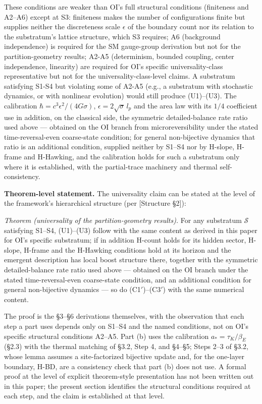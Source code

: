 \documentclass[
]{article}
\begin{document}
These conditions are weaker than OI's full structural conditions
(finiteness and A2--A6) except at S3: finiteness makes the number of
configurations finite but supplies neither the discreteness scale
\(\epsilon\) of the boundary count nor its relation to the substratum's
lattice structure, which S3 requires; A6 (background independence) is
required for the SM gauge-group derivation but not for the
partition-geometry results; A2-A5 (determinism, bounded coupling, center
independence, linearity) are required for OI's specific
universality-class representative but not for the
universality-class-level claims. A substratum satisfying S1-S4 but
violating some of A2-A5 (e.g., a substratum with stochastic dynamics, or
with nonlinear evolution) would still produce (U1)--(U3). The
calibration \(\hbar = c^3 \epsilon^2/(4G\sigma)\),
\(\epsilon = 2\sqrt{\sigma}\,l_p\) and the area law with its \(1/4\)
coefficient use in addition, on the classical side, the symmetric
detailed-balance rate ratio used above --- obtained on the OI branch
from microreversibility under the stated time-reversal-even coarse-state
condition; for general non-bijective dynamics that ratio is an
additional condition, supplied neither by S1--S4 nor by H-slope, H-frame
and H-Hawking, and the calibration holds for such a substratum only
where it is established, with the partial-trace machinery and thermal
self-consistency.

\textbf{Theorem-level statement.} The universality claim can be stated
at the level of the framework's hierarchical structure (per {[}Structure
§2{]}):

\emph{Theorem (universality of the partition-geometry results).} For any
substratum \(\mathcal{S}\) satisfying S1--S4, (U1)--(U3) follow with the
same content as derived in this paper for OI's specific substratum; if
in addition H-count holds for its hidden sector, H-slope, H-frame and
the H-Hawking conditions hold at its horizon and the emergent
description has local boost structure there, together with the symmetric
detailed-balance rate ratio used above --- obtained on the OI branch
under the stated time-reversal-even coarse-state condition, and an
additional condition for general non-bijective dynamics --- so do
(C1\('\))--(C3\('\)) with the same numerical content.

The proof is the §3--§6 derivations themselves, with the observation
that each step a part uses depends only on S1--S4 and the named
conditions, not on OI's specific structural conditions A2--A5. Part (b)
uses the calibration \(a_*=\tau_K/\beta_E\) (§2.3) with the thermal
matching of §3.2, Step 4, and §4--§5; Steps 2--3 of §3.2, whose lemma
assumes a site-factorized bijective update and, for the one-layer
boundary, H-BD, are a consistency check that part (b) does not use. A
formal proof at the level of explicit theorem-style presentation has not
been written out in this paper; the present section identifies the
structural conditions required at each step, and the claim is
established at that level.
\end{document}
